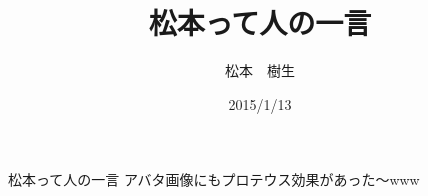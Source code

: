 \documentclass[
10pt, %
twocolumn, %
a4paper %
]{jsarticle}
\title{松本って人の一言}
\author{松本　樹生}
\date{2015/1/13}
\begin{document}
松本って人の一言
アバタ画像にもプロテウス効果があった～www
\end{document}
